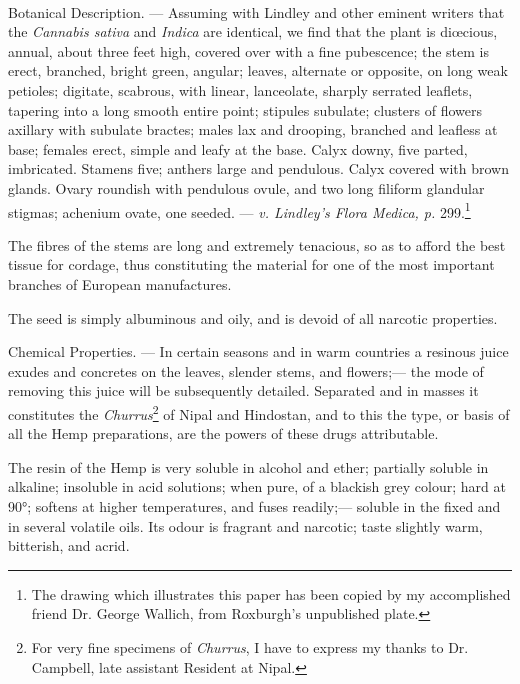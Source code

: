 \documentclass[a4paper, 11pt, oneside, polutonikogreek, english]{article}
\begin{document}
\paragraph{}
Botanical Description. --- Assuming with Lindley and other eminent writers that the \emph{Cannabis sativa} and \emph{Indica} are identical, we find that the plant is diœcious, annual, about three feet high, covered over with a fine pubescence; the stem is erect, branched, bright green, angular; leaves, alternate or opposite, on long weak petioles; digitate, scabrous, with linear, lanceolate, sharply serrated leaflets, tapering into a long smooth entire point; stipules subulate; clusters of flowers axillary with subulate bractes; males lax and drooping, branched and leafless at base; females erect, simple and leafy at the base. \mars Calyx downy, five parted, imbricated. Stamens five; anthers large and pendulous. \venus Calyx covered with brown glands. Ovary roundish with pendulous ovule, and two long filiform glandular stigmas; achenium ovate, one seeded. --- \emph{v. Lindley's Flora Medica, p.} 299.\footnote{The drawing which illustrates this paper has been copied by my accomplished friend Dr. George Wallich, from Roxburgh's unpublished plate.}

The fibres of the stems are long and extremely tenacious, so as to afford the best tissue for cordage, thus constituting the material for one of the most important branches of European manufactures.

The seed is simply albuminous and oily, and is devoid of all narcotic properties.

Chemical Properties. --- In certain seasons and in warm countries a resinous juice exudes and concretes on the leaves, slender stems, and flowers;--- the mode of removing this juice will be subsequently detailed. Separated and in masses it constitutes the \emph{Churrus}\footnote{For very fine specimens of \emph{Churrus}, I have to express my thanks to Dr. Campbell, late assistant Resident at Nipal.} of Nipal and Hindostan, and to this the type, or basis of all the Hemp preparations, are the powers of these drugs attributable.

The resin of the Hemp is very soluble in alcohol and ether; partially soluble in alkaline; insoluble in acid solutions; when pure, of a blackish grey colour; hard at 90°; softens at higher temperatures, and fuses readily;--- soluble in the fixed and in several volatile oils. Its odour is fragrant and narcotic; taste slightly warm, bitterish, and acrid.
\end{document}
